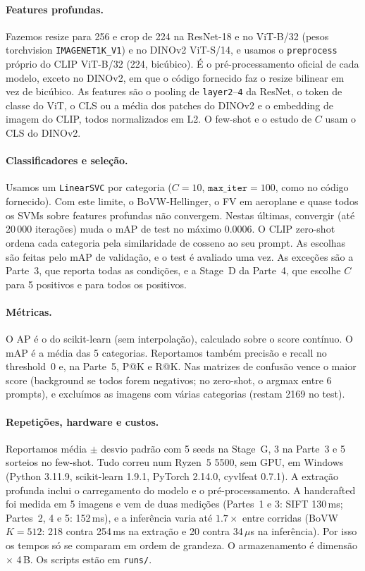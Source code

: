 \paragraph{Features profundas.}
Fazemos resize para 256 e crop de 224 na ResNet-18 e no ViT-B/32 (pesos torchvision \texttt{IMAGENET1K\_V1}) e no DINOv2 ViT-S/14, e usamos o \texttt{preprocess} próprio do CLIP ViT-B/32 (224, bicúbico). É o pré-processamento oficial de cada modelo, exceto no DINOv2, em que o código fornecido faz o resize bilinear em vez de bicúbico. As features são o pooling de \texttt{layer2}--\texttt{4} da ResNet, o token de classe do ViT, o CLS ou a média dos patches do DINOv2 e o embedding de imagem do CLIP, todos normalizados em L2. O few-shot e o estudo de $C$ usam o CLS do DINOv2.

\paragraph{Classificadores e seleção.}
Usamos um \texttt{LinearSVC} por categoria ($C=10$, $\texttt{max\_iter}=100$, como no código fornecido). Com este limite, o BoVW-Hellinger, o FV em aeroplane e quase todos os SVMs sobre features profundas não convergem. Nestas últimas, convergir (até 20\,000 iterações) muda o mAP de test no máximo 0.0006. O CLIP zero-shot ordena cada categoria pela similaridade de cosseno ao seu prompt. As escolhas são feitas pelo mAP de validação, e o test é avaliado uma vez. As exceções são a Parte~3, que reporta todas as condições, e a Stage~D da Parte~4, que escolhe $C$ para 5 positivos e para todos os positivos.

\paragraph{Métricas.}
O AP é o do scikit-learn (sem interpolação), calculado sobre o score contínuo. O mAP é a média das 5 categorias. Reportamos também precisão e recall no threshold~0 e, na Parte~5, P@K e R@K. Nas matrizes de confusão vence o maior score (background se todos forem negativos; no zero-shot, o argmax entre 6 prompts), e excluímos as imagens com várias categorias (restam 2169 no test).

\paragraph{Repetições, hardware e custos.}
Reportamos média $\pm$ desvio padrão com 5 seeds na Stage~G, 3 na Parte~3 e 5 sorteios no few-shot. Tudo correu num Ryzen~5 5500, sem GPU, em Windows (Python 3.11.9, scikit-learn 1.9.1, PyTorch 2.14.0, cyvlfeat 0.7.1). A extração profunda inclui o carregamento do modelo e o pré-processamento. A handcrafted foi medida em 5 imagens e vem de duas medições (Partes~1 e 3: SIFT 130\,ms; Partes~2, 4 e 5: 152\,ms), e a inferência varia até $1.7\times$ entre corridas (BoVW $K=512$: 218 contra 254\,ms na extração e 20 contra 34\,$\mu$s na inferência). Por isso os tempos só se comparam em ordem de grandeza. O armazenamento é dimensão $\times$ 4\,B. Os scripts estão em \texttt{runs/}.